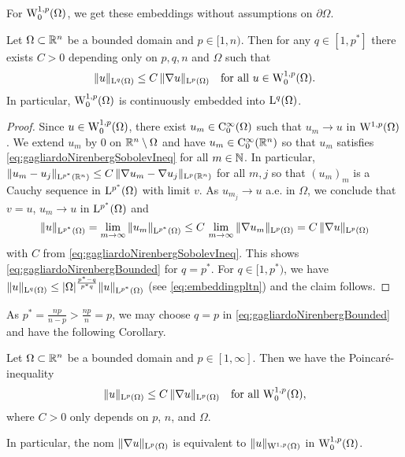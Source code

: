 For $\mathrm{W}_0^{1,p}(\Omega)$, we get these embeddings without assumptions on $\partial\Omega$.

\begin{thm}
  Let $\Omega \subset \mathbb{R}^n$ be a bounded domain and $p \in [1,n)$.
  Then for any $q \in [1,p^*]$ there exists $C > 0$ depending only on $p,q,n$ and $\Omega$ such that 
  \begin{equation}
    \label{eq:gagliardoNirenbergBounded}
    \|u\|_{\mathrm{L}^q(\Omega)} \leq C \, \|\nabla u\|_{\mathrm{L}^p(\Omega)} \quad\text{for all } u \in \mathrm{W}_0^{1,p}(\Omega).
  \end{equation}
  In particular, $\mathrm{W}_0^{1,p}(\Omega)$ is continuously embedded into $\mathrm{L}^q(\Omega)$.
\end{thm}

\begin{proof}
  Since $u \in \mathrm{W}_0^{1,p}(\Omega)$, there exist $u_m \in \mathrm{C}_0^\infty(\Omega)$ such that $u_m \to u$ in $\mathrm{W}^{1,p}(\Omega)$.
  We extend $u_m$ by $0$ on $\mathbb{R}^n\setminus \Omega$ and have $u_m \in \mathrm{C}_0^\infty(\mathbb{R}^n)$ so that $u_m$ satisfies \eqref{eq:gagliardoNirenbergSobolevIneq} for all $m \in \mathbb{N}$.
  In particular, $\|u_m - u_j\|_{\mathrm{L}^{p^*}(\mathbb{R}^n)} \leq C \, \| \nabla u_m - \nabla u_j\|_{\mathrm{L}^p(\mathbb{R}^n)}$ for all $m,j$ so that $(u_m)_m$ is a Cauchy sequence in $\mathrm{L}^{p^*}(\Omega)$ with limit $v$.
  As $u_{m_j} \to u$ a.e. in $\Omega$, we conclude that $v = u$, $u_m \to u$ in $\mathrm{L}^{p^*}(\Omega)$ and 
  $$
  \|u\|_{\mathrm{L}^{p^*}(\Omega)}
  = \lim_{m \to \infty} \| u_m \|_{\mathrm{L}^{p^*}(\Omega)}
  \leq C \, \lim_{m \to \infty} \| \nabla u_m\|_{\mathrm{L}^p(\Omega)}
  = C \, \| \nabla u\|_{\mathrm{L}^p(\Omega)}
  $$
  with $C$ from \eqref{eq:gagliardoNirenbergSobolevIneq}.
  This shows \eqref{eq:gagliardoNirenbergBounded} for $q = p^*$.
  For $q \in [1,p^*)$, we have $\|u\|_{\mathrm{L}^q(\Omega)} \leq |\Omega|^{\frac{p^* - q}{p^* q}} \|u\|_{\mathrm{L}^{p^*}(\Omega)}$ (see \eqref{eq:embeddingpltn}) and the claim follows.
\end{proof}

As $p^* = \frac{np}{n - p} > \frac{np}{n} = p$, we may choose $q = p$ in \eqref{eq:gagliardoNirenbergBounded} and have  the following Corollary.

\begin{cor}
  Let $\Omega \subset \mathbb{R}^n$ be a bounded domain and $p \in [1,\infty]$. 
  Then we have the Poincar\'e-inequality
  \begin{equation}
    \label{eq:poincare}
    \|u\|_{\mathrm{L}^p(\Omega)} \leq C \, \|\nabla u\|_{\mathrm{L}^p(\Omega)} \quad\text{for all } \mathrm{W}_0^{1,p}(\Omega),
  \end{equation}
  where $C > 0$ only depends on $p$, $n$, and $\Omega$.

  In particular, the nom $\|\nabla u\|_{\mathrm{L}^p(\Omega)}$ is equivalent to $\|u\|_{\mathrm{W}^{1,p}(\Omega)}$ in $\mathrm{W}_0^{1,p}(\Omega)$.
\end{cor}

